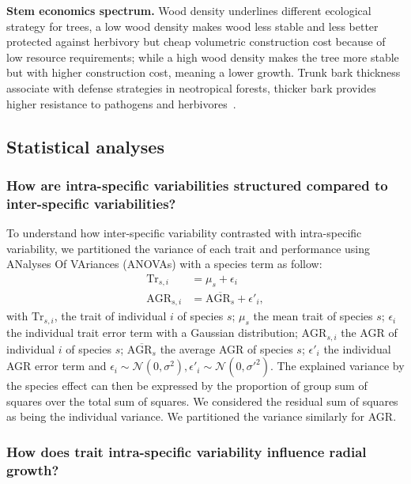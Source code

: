 \textbf{Stem economics spectrum.} Wood density underlines different ecological strategy for trees, a low wood density makes wood less stable and less better protected against herbivory but cheap volumetric construction cost because of low resource requirements; while a high wood density makes the tree more stable but with higher construction cost, meaning a lower growth. Trunk bark thickness associate with defense strategies in neotropical forests, thicker bark provides higher resistance to pathogens and herbivores~\citep{paine_functional_2010}.

\subsection*{Statistical analyses}

\subsubsection*{How are intra-specific variabilities structured compared to inter-specific variabilities?}

To understand how inter-specific variability contrasted with intra-specific variability, we partitioned the variance of each trait and performance using ANalyses Of VAriances (ANOVAs) with a species term as follow:
\begin{subequations}
	\begin{align}
	\label{eq:anovatrait}
	\text{Tr}_{s, i} &= \mu_s + \epsilon_i\\
	\label{eq:anovaagr}
	\text{AGR}_{s, i} &= \overline{\text{AGR}_{s}} + \epsilon'_i,
	\end{align}
\end{subequations}
with $\text{Tr}_{s, i}$, the trait of individual $i$ of species $s$; $\mu_s$ the mean trait of species $s$; $\epsilon_i$ the individual trait error term with a Gaussian distribution; $\text{AGR}_{s, i}$ the AGR of individual $i$ of species $s$; $\overline{\text{AGR}_{s}}$ the average AGR of species $s$; $\epsilon'_i$ the individual AGR error term and $\epsilon_i \sim \mathcal{N}(0, \sigma^2), \epsilon'_i \sim \mathcal{N}(0, \sigma'^2)$. The explained variance by the species effect can then be expressed by the proportion of group sum of squares over the total sum of squares. We considered the residual sum of squares as being the individual variance. We partitioned the variance similarly for AGR.

\subsubsection*{How does trait intra-specific variability influence radial growth?}


